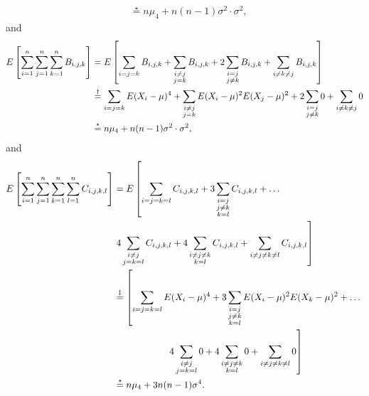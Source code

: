 \documentclass{stat_homework}
\begin{document}
\begin{solution}
\begin{align*}
    &\stackrel{\star}{=} n\mu_4 + n(n-1)\sigma^2\cdot\sigma^2,
  \end{align*}
  and
  \begin{align*}
    E\left[\sum_{i=1}^n\sum_{j=1}^n\sum_{k=1}^n B_{i,j,k}\right]
    &=E\left[\sum_{i=j=k} B_{i,j,k} + \sum_{\substack{i\not= j\\j=k}} B_{i,j,k} + 2\sum_{\substack{i=j \\ j\not=k}} B_{i,j,k} + \sum_{i\not=k\not=j}B_{i,j,k}\right] \\
    &\stackrel{\dagger}{=}\sum_{i=j=k} E(X_i-\mu)^4 + \sum_{\substack{i\not= j\\j=k}} E(X_i-\mu)^2E(X_j-\mu)^2 + 2\sum_{\substack{i=j \\ j\not=k}} 0 + \sum_{i\not=k\not=j} 0 \\
    &\stackrel{\star}{=} n\mu_4 + n(n-1)\sigma^2\cdot\sigma^2,
  \end{align*}
  and
  \begin{align*}
    E\left[\ssssum C_{i,j,k,l}\right]
    &=E\left[
    \sum_{i=j=k=l} C_{i,j,k,l} + 
    3\sum_{\substack{i=j\\j\not=k\\k=l}} C_{i,j,k,l} +\dots
    \right.\\
    &\left.
    4 \sum_{\substack{i\not=j\\j=k=l}} C_{i,j,k,l} +
    4 \sum_{\substack{i\not=j\not=k\\k=l}} C_{i,j,k,l} +
     \sum_{\substack{i\not=j\not=k\not=l}} C_{i,j,k,l}   
    \right]\\
    &\stackrel{\ddagger}{=}\left[
    \sum_{i=j=k=l} E(X_i-\mu)^4 + 
    3\sum_{\substack{i=j\\j\not=k\\k=l}} E(X_i-\mu)^2E(X_k-\mu)^2 +\dots \right.
    \\
    &\left.
    \hspace{2cm}4 \sum_{\substack{i\not=j\\j=k=l}} 0 +
    4 \sum_{\substack{i\not=j\not=k\\k=l}} 0 +
     \sum_{\substack{i\not=j\not=k\not=l}} 0 \right] \\
    &\stackrel{\star}{=}n \mu_4 + 3n(n-1)\sigma^4.

\end{align*}
\end{solution}
\end{document}
